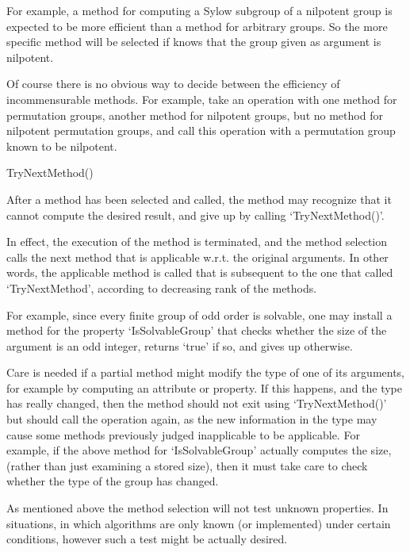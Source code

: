 For example, a method for computing a Sylow subgroup of a nilpotent
group is expected to be more efficient than a method for arbitrary
groups.
So the more specific method will be selected if {\GAP} knows that the
group given as argument is nilpotent.

Of course there is no obvious way to decide between the efficiency of
incommensurable methods.
For example, take an operation with one method for permutation groups,
another method for nilpotent groups,
but no method for nilpotent permutation groups,
and call this operation with a permutation group known to be
nilpotent.


\>TryNextMethod()

After a method has been selected and called,
the method may recognize that it cannot compute the desired result,
and give up by calling `TryNextMethod()'.

In effect, the execution of the method is terminated,
and the method selection calls the next method that is applicable w.r.t.
the original arguments.
In other words, the applicable method is called that is subsequent to the
one that called `TryNextMethod',
according to decreasing rank of the methods.

For example, since every finite group of odd order is solvable,
one may install a method for the property `IsSolvableGroup' that checks
whether the size of the argument is an odd integer,
returns `true' if so,
and gives up otherwise.

Care is  needed  if a  partial  method  might  modify the  type of  one  of its
arguments, for example by computing an attribute  or property. If this happens,
and the type  has   really changed, then  the  method  should not  exit   using
`TryNextMethod()' but  should call the operation again,  as the new information
in the type may   cause  some methods  previously   judged inapplicable to   be
applicable. For  example, if  the  above method  for `IsSolvableGroup' actually
computes the size, (rather than  just examining  a  stored size), then it  must
take care to check whether the type of the group has changed.


As mentioned above the method selection will not test unknown properties.
In situations, in which algorithms are only known (or implemented) under
certain conditions, however such a test might be actually desired.

